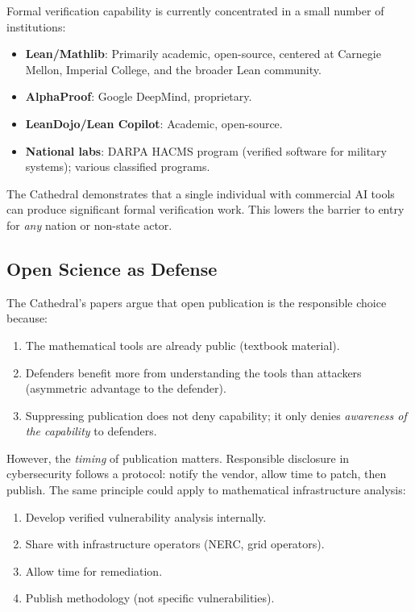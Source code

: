 \documentclass[11pt,a4paper]{article}
\begin{document}
Formal verification capability is currently concentrated in a
small number of institutions:

\begin{itemize}
  \item \textbf{Lean/Mathlib}: Primarily academic, open-source,
    centered at Carnegie Mellon, Imperial College, and the broader
    Lean community.
  \item \textbf{AlphaProof}: Google DeepMind, proprietary.
  \item \textbf{LeanDojo/Lean Copilot}: Academic, open-source.
  \item \textbf{National labs}: DARPA HACMS program (verified software
    for military systems); various classified programs.
\end{itemize}

The Cathedral demonstrates that a single individual with commercial
AI tools can produce significant formal verification work. This
lowers the barrier to entry for \emph{any} nation or non-state
actor.

\subsection{Open Science as Defense}

The Cathedral's papers argue that open publication is the responsible
choice because:

\begin{enumerate}
  \item The mathematical tools are already public (textbook material).
  \item Defenders benefit more from understanding the tools than
    attackers (asymmetric advantage to the defender).
  \item Suppressing publication does not deny capability; it only
    denies \emph{awareness of the capability} to defenders.
\end{enumerate}

However, the \emph{timing} of publication matters. Responsible
disclosure in cybersecurity follows a protocol: notify the vendor,
allow time to patch, then publish. The same principle could apply
to mathematical infrastructure analysis:

\begin{enumerate}
  \item Develop verified vulnerability analysis internally.
  \item Share with infrastructure operators (NERC, grid operators).
  \item Allow time for remediation.
  \item Publish methodology (not specific vulnerabilities).
\end{enumerate}
\end{document}
